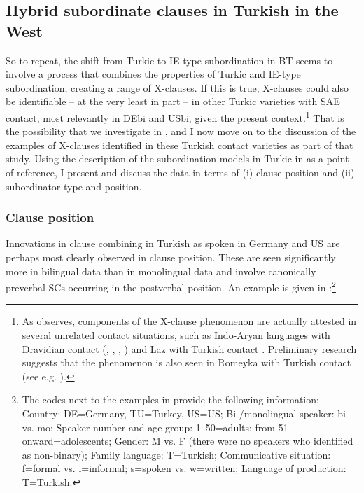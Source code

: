 \documentclass[output=paper,colorlinks,citecolor=brown]{langscibook}
\begin{document}
\subsection{Hybrid subordinate clauses in Turkish in the West}
\label{sec:keskin:X_in_HTR}

So to repeat, the shift from Turkic to IE-type subordination in BT seems to involve a process that combines the properties of Turkic and IE-type subordination, creating a range of X-clauses. If this is true, X-clauses could also be identifiable -- at the very least in part -- in other Turkic varieties with SAE contact, most relevantly in DEbi and USbi, given the present context.\footnote{As \citet{Keskin.transientBT} observes, components of the X-clause phenomenon are actually attested in several unrelated contact situations, such as Indo-Aryan languages with Dravidian contact (\citealt{Bayer.2001}, \citealt[214]{Dhongde.Wali.2009}, \citealt[541–542]{Hock.2021}, \citealt[2, 6, 70]{Pandharipande.1997}) and Laz with Turkish contact \citep{DemirokOzturk2022}. Preliminary research suggests that the phenomenon is also seen in Romeyka with Turkish contact (see e.g. \citealt{Keskinetal.Romeyka.lacbam,SchreiberRomsketch,Schreiber.Rom.diss}).} That is the possibility that we investigate in \citet{Keskinetal.combining}, and I now move on to the discussion of the examples of X-clauses identified in these Turkish contact varieties as part of that study. Using the description of the subordination models in Turkic in  as a point of reference, I present and discuss the data in terms of (i) clause position and (ii) subordinator type and position.

\subsubsection{Clause position}
\label{sec:keskin:cl_pos}

Innovations in clause combining in Turkish as spoken in Germany and US are perhaps most clearly observed in clause position. These are seen significantly more in bilingual data than in monolingual data and involve canonically preverbal SCs occurring in the postverbal position. An example is given in :\footnote{The codes next to the examples in  provide the following information: Country: DE=Germany, TU=Turkey, US=US; Bi-/monolingual speaker: bi vs. mo; Speaker number and age group: 1--50=adults; from 51 onward=adolescents; Gender: M vs. F (there were no speakers who identified as non-binary); Family language: T=Turkish; Communicative situation: f=formal vs. i=informal; s=spoken vs. w=written; Language of production: T=Turkish.}
\end{document}

